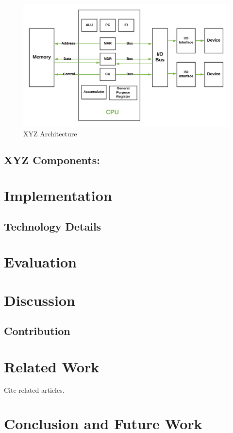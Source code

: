 \documentclass[10pt, journal, letterpaper]{article}
\newcommand{\solname}{XYZ\xspace}
\begin{document}
	\begin{figure}
		\centering
		\includegraphics[width=\columnwidth]{img/computer-architecture} 
		\caption{\solname Architecture}
		\label{fig:frz-arch}
	\end{figure}
	\lipsum[12]
	
	\subsection{\solname Components:}
	\lipsum[13]

	\section{Implementation}
	\lipsum[14]
	
	\subsection{Technology Details}
	\lipsum[15]

	\section{Evaluation}
	\lipsum[16-17]
	
	\section{Discussion}
	\lipsum[18]
	\subsection{Contribution}
	\lipsum[7-8]
	
	\section{Related Work}
	Cite related articles\cite{day1998write}.
	\lipsum[19]

	\section{Conclusion and Future Work}
	\label{conclusion}
	\lipsum[19]

	\printbibliography
%
%	
\end{document}
